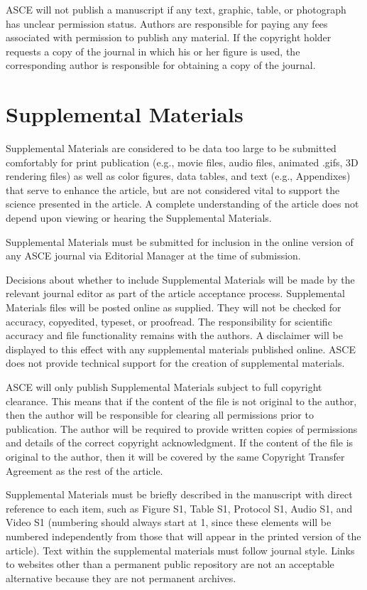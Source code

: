 \documentclass[Journal,LineNumbers]{ascelike-new}
\begin{document}
ASCE will not publish a manuscript if any text, graphic, table, or
photograph has unclear permission status. Authors are responsible for
paying any fees associated with permission to publish any material. If
the copyright holder requests a copy of the journal in which his or her
figure is used, the corresponding author is responsible for obtaining a
copy of the journal.

\section{Supplemental Materials}\label{supplemental-materials}

Supplemental Materials are considered to be data too large to be
submitted comfortably for print publication (e.g., movie files, audio
files, animated .gifs, 3D rendering files) as well as color figures,
data tables, and text (e.g., Appendixes) that serve to enhance the
article, but are not considered vital to support the science presented
in the article. A complete understanding of the article does not depend
upon viewing or hearing the Supplemental Materials.

Supplemental Materials must be submitted for inclusion in the online
version of any ASCE journal via Editorial Manager at the time of
submission.

Decisions about whether to include Supplemental Materials will be made
by the relevant journal editor as part of the article acceptance
process. Supplemental Materials files will be posted online as supplied.
They will not be checked for accuracy, copyedited, typeset, or
proofread. The responsibility for scientific accuracy and file
functionality remains with the authors. A disclaimer will be displayed
to this effect with any supplemental materials published online. ASCE
does not provide technical support for the creation of supplemental
materials.

ASCE will only publish Supplemental Materials subject to full copyright
clearance. This means that if the content of the file is not original to
the author, then the author will be responsible for clearing all
permissions prior to publication. The author will be required to provide
written copies of permissions and details of the correct copyright
acknowledgment. If the content of the file is original to the author,
then it will be covered by the same Copyright Transfer Agreement as the
rest of the article.

Supplemental Materials must be briefly described in the manuscript with
direct reference to each item, such as Figure S1, Table S1, Protocol S1,
Audio S1, and Video S1 (numbering should always start at 1, since these
elements will be numbered independently from those that will appear in
the printed version of the article). Text within the supplemental
materials must follow journal style. Links to websites other than a
permanent public repository are not an acceptable alternative because
they are not permanent archives.
\end{document}
